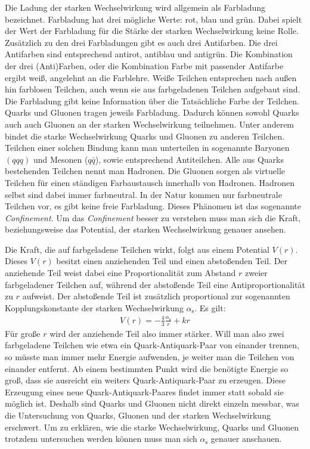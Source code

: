 Die Ladung der starken Wechselwirkung wird allgemein als Farbladung bezeichnet.
Farbladung hat drei m\"ogliche \grqq{}Werte\grqq{}: rot, blau und gr\"un.
Dabei spielt der \grqq{}Wert\grqq{} der Farbladung f\"ur die St\"arke der starken Wechselwirkung keine Rolle.
Zus\"atzlich zu den drei Farbladungen gibt es auch drei Antifarben. 
Die drei Antifarben sind entsprechend antirot, antiblau und antigr\"un.
Die Kombination der drei (Anti)Farben, oder die Kombination Farbe mit passender Antifarbe ergibt wei{\ss}, angelehnt an die Farblehre.
Wei{\ss}e Teilchen entsprechen nach au{\ss}en hin farblosen Teilchen, auch wenn sie aus farbgeladenen Teilchen aufgebaut sind.
Die Farbladung gibt keine Information \"uber die Tats\"achliche Farbe der Teilchen. 
Quarks und Gluonen tragen jeweils Farbladung.
Dadurch k\"onnen sowohl Quarks auch auch Gluonen an der starken Wechselwirkung teilnehmen.
Unter anderem bindet die starke Wechselwirkung Quarks und Gluonen zu anderen Teilchen.
Teilchen einer solchen Bindung kann man unterteilen in sogenannte Baryonen $(qqq)$ und Mesonen ($q\bar{q}$), sowie entsprechend Antiteilchen.
Alle aus Quarks bestehenden Teilchen nennt man Hadronen.
Die Gluonen sorgen als virtuelle Teilchen f\"ur einen st\"andigen Farbaustausch innerhalb von Hadronen.
Hadronen selbst sind dabei immer farbneutral.
In der Natur kommen nur farbneutrale Teilchen vor, es gibt keine freie Farbladung.
Dieses Ph\"anomen ist das sogenannte \textit{Confinement}.
Um das \textit{Confinement} besser zu verstehen muss man sich die Kraft, beziehungsweise das Potential, der starken Wechselwirkung genauer ansehen.

Die Kraft, die auf farbgeladene Teilchen wirkt, folgt aus einem Potential $V(r)$.
Dieses $V(r)$ besitzt einen anziehenden Teil und einen abstoßenden Teil.
Der anziehende Teil weist dabei eine Proportionalit\"at zum Abstand $r$ zweier farbgeladener Teilchen auf, w\"ahrend der absto{\ss}ende Teil eine Antiproportionalit\"at zu $r$ aufweist.
Der absto{\ss}ende Teil ist zus\"atzlich proportional zur sogenannten Kopplungskonstante der starken Wechselwirkung $\alpha_\text{s}$.
Es gilt:
\begin{align} \label{eq:Potential}
V(r) = -\frac{4}{3}\frac{\alpha_\text{s}}{r} + kr
\end{align}
F\"ur gro{\ss}e $r$ wird der anziehende Teil also immer stärker.
Will man also zwei farbgeladene Teilchen wie etwa ein Quark-Antiquark-Paar von einander trennen, so m\"usste man immer mehr Energie aufwenden, je weiter man die Teilchen von einander entfernt.
Ab einem bestimmten Punkt wird die ben\"otigte Energie so gro{\ss}, dass sie ausreicht ein weiters Quark-Antiquark-Paar zu erzeugen.
Diese Erzeugung eines neue Quark-Antiquark-Paares findet immer statt sobald sie m\"oglich ist.
Deshalb sind Quarks und Gluonen nicht direkt einzeln messbar, was die Untersuchung von Quarks, Gluonen und der starken Wechselwirkung erschwert.
Um zu erkl\"aren, wie die starke Wechselwirkung, Quarks und Gluonen trotzdem untersuchen werden k\"onnen muss man sich $\alpha_\text{s}$ genauer anschauen. 

